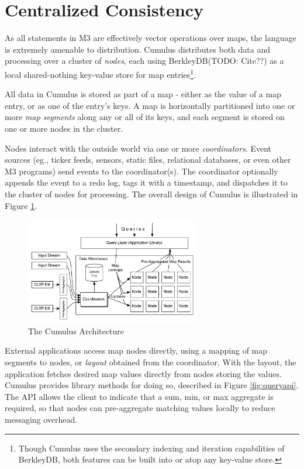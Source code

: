 \documentclass{vldb}
\begin{document}
\section{Centralized Consistency}

As all statements in M3 are effectively vector operations over maps, the language is extremely amenable to distribution.  Cumulus distributes both data and processing over a cluster of \textit{nodes}, each using BerkleyDB(TODO: Cite??) as a local shared-nothing key-value store for map entries\footnote{Though Cumulus uses the secondary indexing and iteration capabilities of BerkleyDB, both features can be built into or atop any key-value store.}.

All data in Cumulus is stored as part of a map - either as the value of a map entry, or as one of the entry's keys.  A map is horizontally partitioned into one or more \textit{map segments} along any or all of its keys, and each segment is stored on one or more nodes in the cluster.

Nodes interact with the outside world via one or more \textit{coordinators}.  Event sources (eg., ticker feeds, sensors, static files, relational databases, or even other M3 programs) send events to the coordinator(s).  The coordinator optionally appends the event to a redo log, tags it with a timestamp, and dispatches it to the cluster of nodes for processing.  The overall design of Cumulus is illustrated in Figure \ref{fig:architecture}.

\begin{figure}
\includegraphics[width=3in]{graphics/Architecture.pdf}
\caption{The Cumulus Architecture}
\label{fig:architecture}
\end{figure}

External applications access map nodes directly, using a mapping of map segments to nodes, or \textit{layout} obtained from the coordinator.  With the layout, the application fetches desired map values directly from nodes storing the values.  Cumulus provides library methods for doing so, described in Figure \ref{fig:queryapi}.  The API allows the client to indicate that a sum, min, or max aggregate is required, so that nodes can pre-aggregate matching values locally to reduce messaging overhead.
\end{document}
